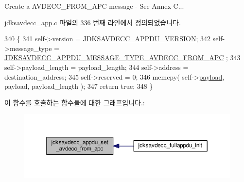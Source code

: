 Create a A\+V\+D\+E\+C\+C\+\_\+\+F\+R\+O\+M\+\_\+\+A\+PC message -\/ See Annex C... 

jdksavdecc\+\_\+app.\+c 파일의 336 번째 라인에서 정의되었습니다.


\begin{DoxyCode}
340 \{
341     \textcolor{keyword}{self}->version = \hyperlink{group__appdu__constants_ga56dc385655e74f514e98341140261880}{JDKSAVDECC\_APPDU\_VERSION};
342     \textcolor{keyword}{self}->message\_type = \hyperlink{group__appdu__constants_gae1865f8d6a4ab7442673d2f81c5b13ab}{JDKSAVDECC\_APPDU\_MESSAGE\_TYPE\_AVDECC\_FROM\_APC}
      ;
343     \textcolor{keyword}{self}->payload\_length = payload\_length;
344     \textcolor{keyword}{self}->address = destination\_address;
345     \textcolor{keyword}{self}->reserved = 0;
346     memcpy( self->\hyperlink{structjdksavdecc__appdu_aa5cbdad2c57e9b3f949e1a4d96382b66}{payload}, payload, payload\_length );
347     \textcolor{keywordflow}{return} \textcolor{keyword}{true};
348 \}
\end{DoxyCode}


이 함수를 호출하는 함수들에 대한 그래프입니다.\+:
\nopagebreak
\begin{figure}[H]
\begin{center}
\leavevmode
\includegraphics[width=350pt]{group__app_ga04847b72d4e704877ee24c8eeb63df0f_icgraph}
\end{center}
\end{figure}


